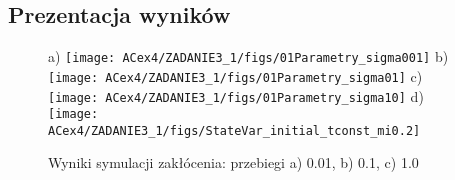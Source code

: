 \documentclass[10pt, a4paper, polish]{article}
\begin{document}
	\subsection{Prezentacja wyników}
	\begin{figure}[h]
		\centering	
		a) \texttt{[image: ACex4/ZADANIE3\_1/figs/01Parametry\_sigma001]} b)\texttt{[image: ACex4/ZADANIE3\_1/figs/01Parametry\_sigma01]} c)\texttt{[image: ACex4/ZADANIE3\_1/figs/01Parametry\_sigma10]}
		d)\texttt{[image: ACex4/ZADANIE3\_1/figs/StateVar\_initial\_tconst\_mi0.2]}
		\caption{
			Wyniki symulacji zakłócenia: przebiegi a) 0.01, b) 0.1, c)  1.0}\label{fig:hiperkula12v}
	\end{figure}
		
\end{document}
